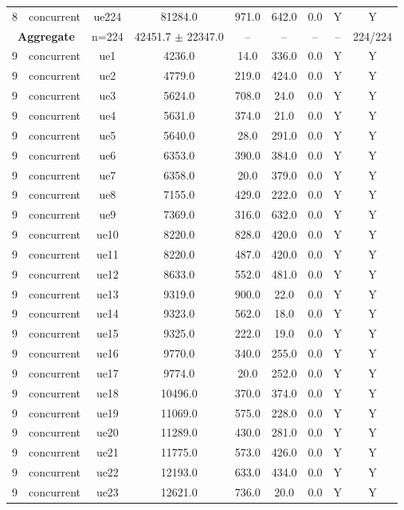 \begin{table}[ht]
\begin{tabular}{|c|c|c|c|c|c|c|c|c|}
8 & concurrent & ue224 & 81284.0 & 971.0 & 642.0 & 0.0 & Y & Y \\
\multicolumn{2}{|c|}{\textbf{Aggregate}} & n=224 & 42451.7 $\pm$ 22347.0 & -- & -- & -- & -- & 224/224 \\
\hline
9 & concurrent & ue1 & 4236.0 & 14.0 & 336.0 & 0.0 & Y & Y \\
9 & concurrent & ue2 & 4779.0 & 219.0 & 424.0 & 0.0 & Y & Y \\
9 & concurrent & ue3 & 5624.0 & 708.0 & 24.0 & 0.0 & Y & Y \\
9 & concurrent & ue4 & 5631.0 & 374.0 & 21.0 & 0.0 & Y & Y \\
9 & concurrent & ue5 & 5640.0 & 28.0 & 291.0 & 0.0 & Y & Y \\
9 & concurrent & ue6 & 6353.0 & 390.0 & 384.0 & 0.0 & Y & Y \\
9 & concurrent & ue7 & 6358.0 & 20.0 & 379.0 & 0.0 & Y & Y \\
9 & concurrent & ue8 & 7155.0 & 429.0 & 222.0 & 0.0 & Y & Y \\
9 & concurrent & ue9 & 7369.0 & 316.0 & 632.0 & 0.0 & Y & Y \\
9 & concurrent & ue10 & 8220.0 & 828.0 & 420.0 & 0.0 & Y & Y \\
9 & concurrent & ue11 & 8220.0 & 487.0 & 420.0 & 0.0 & Y & Y \\
9 & concurrent & ue12 & 8633.0 & 552.0 & 481.0 & 0.0 & Y & Y \\
9 & concurrent & ue13 & 9319.0 & 900.0 & 22.0 & 0.0 & Y & Y \\
9 & concurrent & ue14 & 9323.0 & 562.0 & 18.0 & 0.0 & Y & Y \\
9 & concurrent & ue15 & 9325.0 & 222.0 & 19.0 & 0.0 & Y & Y \\
9 & concurrent & ue16 & 9770.0 & 340.0 & 255.0 & 0.0 & Y & Y \\
9 & concurrent & ue17 & 9774.0 & 20.0 & 252.0 & 0.0 & Y & Y \\
9 & concurrent & ue18 & 10496.0 & 370.0 & 374.0 & 0.0 & Y & Y \\
9 & concurrent & ue19 & 11069.0 & 575.0 & 228.0 & 0.0 & Y & Y \\
9 & concurrent & ue20 & 11289.0 & 430.0 & 281.0 & 0.0 & Y & Y \\
9 & concurrent & ue21 & 11775.0 & 573.0 & 426.0 & 0.0 & Y & Y \\
9 & concurrent & ue22 & 12193.0 & 633.0 & 434.0 & 0.0 & Y & Y \\
9 & concurrent & ue23 & 12621.0 & 736.0 & 20.0 & 0.0 & Y & Y \\

\end{tabular}
\end{table}
